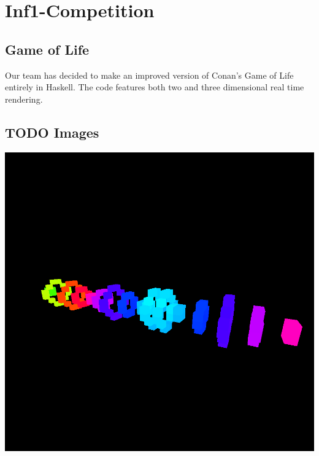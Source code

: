 \documentclass[11pt]{article}
\author{Kyle Cotton}
\date{\today}
\title{}
\begin{document}
\tableofcontents

\section{Inf1-Competition}
\label{sec:org58a3b01}
\subsection{Game of Life}
\label{sec:org3b8b115}
Our team has decided to make an improved version of Conan's Game of Life entirely in Haskell.
The code features both two and three dimensional real time rendering.

\subsection{{\bfseries\sffamily TODO} Images}
\label{sec:orgf5664be}

\begin{center}
\includegraphics[width=.9\linewidth]{1.png}
\end{center}
\end{document}
